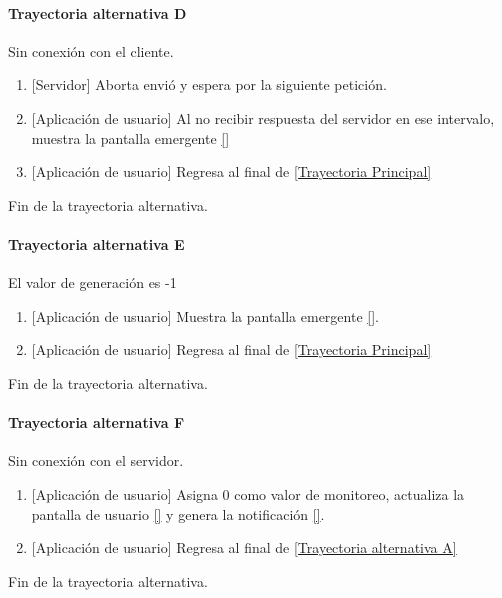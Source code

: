 \paragraph{Trayectoria alternativa D} \label{SUB-M-CU5:TD}
	Sin conexión con el cliente.
	\begin{enumerate}[label=D\arabic*.]
		\item {[Servidor]} Aborta envió y espera por la siguiente petición.
		\item {[Aplicación de usuario]} Al no recibir respuesta del servidor en ese intervalo, muestra la pantalla emergente \ref{}
		\item {[Aplicación de usuario]} Regresa al final de \hyperref[SUB-M-CU5:TP]{[Trayectoria Principal]}
	\end{enumerate}
	Fin de la trayectoria alternativa.
	
\paragraph{Trayectoria alternativa E} \label{SUB-M-CU5:TE}
	El valor de generación es -1
	\begin{enumerate}[label=E\arabic*.]
		\item {[Aplicación de usuario]} Muestra la pantalla emergente \ref{}.
		\item {[Aplicación de usuario]} Regresa al final de \hyperref[SUB-M-CU5:TP]{[Trayectoria Principal]}
	\end{enumerate}
	Fin de la trayectoria alternativa.
	
\paragraph{Trayectoria alternativa F} \label{SUB-M-CU5:TF}
	Sin conexión con el servidor.
	\begin{enumerate}[label=F\arabic*.]
		\item {[Aplicación de usuario]} Asigna 0 como valor de monitoreo, actualiza la pantalla de usuario \ref{}  y genera la notificación \ref{}.
		\item {[Aplicación de usuario]} Regresa al final de \hyperref[SUB-M-CU5:TA]{[Trayectoria alternativa A]}
	\end{enumerate}
	Fin de la trayectoria alternativa.
	
